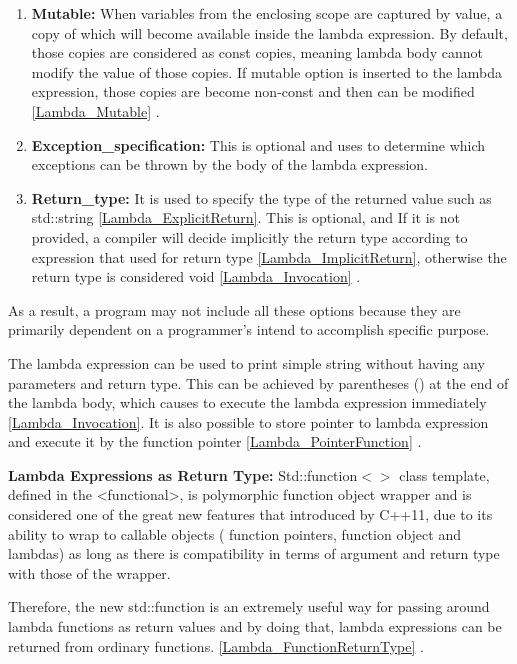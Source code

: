 \documentclass[11pt]{report}
\begin{document}
\begin{enumerate}
\begin{enumerate}
\item \textbf{Mutable:} When variables from the enclosing scope are captured by value, a copy of which will become available inside the lambda expression. By default, those copies are considered as const copies, meaning lambda body cannot modify the value of those copies. If mutable option is inserted to the lambda expression, those copies are become non-const and then can be modified \ref{Lambda_Mutable} \cite{Cppreference:2012:Cpp11}.

\item \textbf{Exception\_specification:} This is optional and uses to determine which exceptions can be thrown by the body of the lambda expression.

\item \textbf{Return\_type:} It is used to specify the type of the returned value such as std::string \ref{Lambda_ExplicitReturn}. This is optional, and If it is not provided, a compiler will decide implicitly the return type according to expression that used for return type \ref{Lambda_ImplicitReturn}, otherwise the return type is considered void \ref{Lambda_Invocation} \cite{Cppreference:2012:Cpp11}.
\end{enumerate}

As a result, a program may not include all these options because they are primarily dependent on a programmer's intend to accomplish specific purpose.
\newline

The lambda expression can be used to print simple string without having any parameters and return type. This can be achieved by parentheses () at the end of the lambda body, which causes to execute the lambda expression immediately \ref{Lambda_Invocation}. It is also possible to store pointer to lambda expression and execute it by the function pointer \ref{Lambda_PointerFunction} \cite{Gregorie:professionalcpp}.
\newline

\textbf{Lambda Expressions as Return Type:} Std::function$<>$ class template, defined in the <functional>, is polymorphic function object wrapper and is considered one of the great new features that introduced by C++11, due to its ability to wrap to callable objects ( function pointers, function object and lambdas) as long as there is compatibility in terms of argument  and return type with those of the wrapper.
\newline

Therefore, the new std::function is an extremely useful way for passing around lambda functions as return values and by doing that, lambda expressions can be returned from ordinary functions. \ref{Lambda_FunctionReturnType} \cite {Josuttis:2012:CppStandard Library}.
\newline


\end{enumerate}
\end{document}
